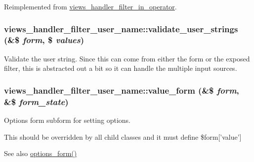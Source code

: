 Reimplemented from \hyperlink{classviews__handler__filter__in__operator_aa5b5df6d90f4359ed28c0c446bdc81a6}{views\_\-handler\_\-filter\_\-in\_\-operator}.\hypertarget{classviews__handler__filter__user__name_a8c3d5b4e3a63b0e39fcf36a2ab5ef43d}{
\subsubsection[{validate\_\-user\_\-strings}]{\setlength{\rightskip}{0pt plus 5cm}views\_\-handler\_\-filter\_\-user\_\-name::validate\_\-user\_\-strings (\&\$ {\em form}, \/  \$ {\em values})}}
\label{classviews__handler__filter__user__name_a8c3d5b4e3a63b0e39fcf36a2ab5ef43d}
Validate the user string. Since this can come from either the form or the exposed filter, this is abstracted out a bit so it can handle the multiple input sources. \hypertarget{classviews__handler__filter__user__name_a08bc953c1682728eb0d38e5592a3286e}{
\subsubsection[{value\_\-form}]{\setlength{\rightskip}{0pt plus 5cm}views\_\-handler\_\-filter\_\-user\_\-name::value\_\-form (\&\$ {\em form}, \/  \&\$ {\em form\_\-state})}}
\label{classviews__handler__filter__user__name_a08bc953c1682728eb0d38e5592a3286e}
Options form subform for setting options.

This should be overridden by all child classes and it must define \$form\mbox{[}'value'\mbox{]}

\begin{DoxySeeAlso}{See also}
\hyperlink{classviews__handler__filter_af14c69367162057a32709a6340de0988}{options\_\-form()} 
\end{DoxySeeAlso}


